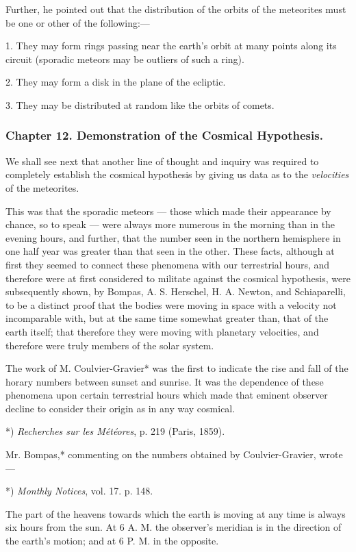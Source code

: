 \documentclass[a4paper, 12pt, oneside, polutonikogreek, english]{article}
\begin{document}
Further, he pointed out that the distribution of the orbits of the meteorites must be one or other of the following:---

1. They may form rings passing near the earth's orbit at many points along its circuit (sporadic meteors may be outliers of such a ring).

2. They may form a disk in the plane of the ecliptic.

3. They may be distributed at random like the orbits of comets.

\subsubsection{Chapter 12. Demonstration of the Cosmical Hypothesis.}

We shall see next that another line of thought and inquiry was required to completely establish the cosmical hypothesis by giving us data as to the \emph{velocities} of the meteorites.

This was that the sporadic meteors --- those which made their appearance by chance, so to speak --- were always more numerous in the morning than in the evening hours, and further, that the number seen in the northern hemisphere in one half year was greater than that seen in the other. These facts, although at first they seemed to connect these phenomena with our terrestrial hours, and therefore were at first considered to militate against the cosmical hypothesis, were subsequently shown, by Bompas, A. S. Herschel, H. A. Newton, and Schiaparelli, to be a distinct proof that the bodies were moving in space with a velocity not incomparable with, but at the same time somewhat greater than, that of the earth itself; that therefore they were moving with planetary velocities, and therefore were truly members of the solar system.

The work of M. Coulvier-Gravier* was the first to indicate the rise and fall of the horary numbers between sunset and sunrise. It was the dependence of these phenomena upon certain terrestrial hours which made that eminent observer decline to consider their origin as in any way cosmical.

*) \emph{Recherches sur les Météores}, p. 219 (Paris, 1859).

Mr. Bompas,* commenting on the numbers obtained by Coulvier-Gravier, wrote ---

*) \emph{Monthly Notices}, vol. 17. p. 148.

The part of the heavens towards which the earth is moving at any time is always six hours from the sun. At 6 A. M. the observer's meridian is in the direction of the earth's motion; and at 6 P. M. in the opposite.
\end{document}
